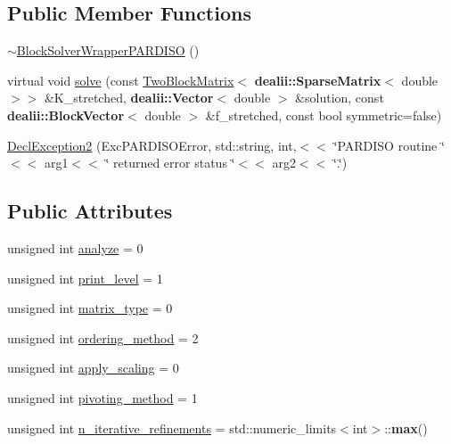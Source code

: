 \subsection*{Public Member Functions}
\begin{DoxyCompactItemize}
\item 
\hyperlink{class_block_solver_wrapper_p_a_r_d_i_s_o_a22f5bc2196681e319b323549a457178a}{$\sim$\+Block\+Solver\+Wrapper\+P\+A\+R\+D\+I\+SO} ()
\item 
virtual void \hyperlink{class_block_solver_wrapper_p_a_r_d_i_s_o_a73135d179e0618be550b9089c3c70689}{solve} (const \hyperlink{class_two_block_matrix}{Two\+Block\+Matrix}$<$ {\bf dealii\+::\+Sparse\+Matrix}$<$ double $>$$>$ \&K\+\_\+stretched, {\bf dealii\+::\+Vector}$<$ double $>$ \&solution, const {\bf dealii\+::\+Block\+Vector}$<$ double $>$ \&f\+\_\+stretched, const bool symmetric=false)
\item 
\hyperlink{class_block_solver_wrapper_p_a_r_d_i_s_o_a8bb0292df53f83055f387c49f060499f}{Decl\+Exception2} (Exc\+P\+A\+R\+D\+I\+S\+O\+Error, std\+::string, int,$<$$<$ \char`\"{}P\+A\+R\+D\+I\+SO routine \char`\"{}$<$$<$ arg1$<$$<$ \char`\"{} returned error status \char`\"{}$<$$<$ arg2$<$$<$ \char`\"{}.\char`\"{})
\end{DoxyCompactItemize}
\subsection*{Public Attributes}
\begin{DoxyCompactItemize}
\item 
unsigned int \hyperlink{class_block_solver_wrapper_p_a_r_d_i_s_o_a3df0818f957b743717ce4bfd463ff8dd}{analyze} = 0
\item 
unsigned int \hyperlink{class_block_solver_wrapper_p_a_r_d_i_s_o_aa87e38dcf8e35852fbb47b4792b2540d}{print\+\_\+level} = 1
\item 
unsigned int \hyperlink{class_block_solver_wrapper_p_a_r_d_i_s_o_adc6d3f7f878c578aff518cb907e157ff}{matrix\+\_\+type} = 0
\item 
unsigned int \hyperlink{class_block_solver_wrapper_p_a_r_d_i_s_o_a3bf4e0ea8332a4e6c71eac84f385663c}{ordering\+\_\+method} = 2
\item 
unsigned int \hyperlink{class_block_solver_wrapper_p_a_r_d_i_s_o_aba68acd666b7c5c41af207eb77db201c}{apply\+\_\+scaling} = 0
\item 
unsigned int \hyperlink{class_block_solver_wrapper_p_a_r_d_i_s_o_a2924ded1d130cdd30e865ff664d8dcf7}{pivoting\+\_\+method} = 1
\item 
unsigned int \hyperlink{class_block_solver_wrapper_p_a_r_d_i_s_o_afdb2039acda86d2def4e0eee33635dab}{n\+\_\+iterative\+\_\+refinements} = std\+::numeric\+\_\+limits$<$int$>$\+::{\bf max}()
\end{DoxyCompactItemize}
